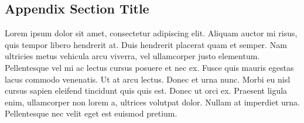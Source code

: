 \documentclass[
	UTF-8,
	11pt, %
	a4paper, %
]{LegrandOrangeBook}
\begin{document}
\begin{appendices}
\section{Appendix Section Title}

Lorem ipsum dolor sit amet, consectetur adipiscing elit. Aliquam auctor mi risus, quis tempor libero hendrerit at. Duis hendrerit placerat quam et semper. Nam ultricies metus vehicula arcu viverra, vel ullamcorper justo elementum. Pellentesque vel mi ac lectus cursus posuere et nec ex. Fusce quis mauris egestas lacus commodo venenatis. Ut at arcu lectus. Donec et urna nunc. Morbi eu nisl cursus sapien eleifend tincidunt quis quis est. Donec ut orci ex. Praesent ligula enim, ullamcorper non lorem a, ultrices volutpat dolor. Nullam at imperdiet urna. Pellentesque nec velit eget est euismod pretium.


\end{appendices}

\end{document}
